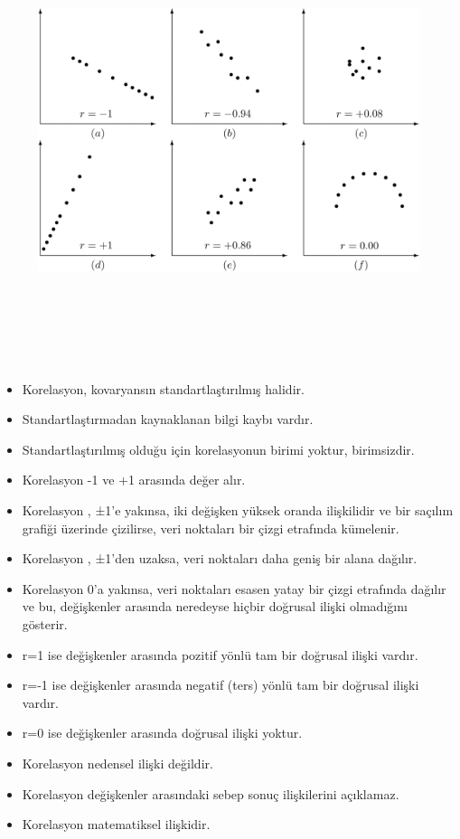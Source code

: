 \documentclass[
  letterpaper,
  DIV=11,
  numbers=noendperiod]{scrreprt}
\begin{document}
\begin{figure}

{\centering \includegraphics[width=7.6875in,height=5.15625in]{images/korelasyon.png}

}

\end{figure}

\begin{itemize}
\item
  Korelasyon, kovaryansın standartlaştırılmış halidir.
\item
  Standartlaştırmadan kaynaklanan bilgi kaybı vardır.
\item
  Standartlaştırılmış olduğu için korelasyonun birimi yoktur,
  birimsizdir.
\item
  Korelasyon -1 ve +1 arasında değer alır.
\item
  Korelasyon , ±1'e yakınsa, iki değişken yüksek oranda ilişkilidir ve
  bir saçılım grafiği üzerinde çizilirse, veri noktaları bir çizgi
  etrafında kümelenir.
\item
  Korelasyon , ±1'den uzaksa, veri noktaları daha geniş bir alana
  dağılır.
\item
  Korelasyon 0'a yakınsa, veri noktaları esasen yatay bir çizgi
  etrafında dağılır ve bu, değişkenler arasında neredeyse hiçbir
  doğrusal ilişki olmadığını gösterir.
\item
  r=1 ise değişkenler arasında pozitif yönlü tam bir doğrusal ilişki
  vardır.
\item
  r=-1 ise değişkenler arasında negatif (ters) yönlü tam bir doğrusal
  ilişki vardır.
\item
  r=0 ise değişkenler arasında doğrusal ilişki yoktur.
\item
  Korelasyon nedensel ilişki değildir.
\item
  Korelasyon değişkenler arasındaki sebep sonuç ilişkilerini açıklamaz.
\item
  Korelasyon matematiksel ilişkidir.
\end{itemize}
\end{document}
